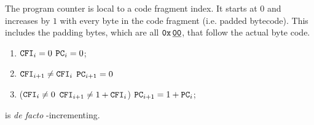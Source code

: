 The program counter \pc{} is local to a code fragment index.
It starts at $0$ and increases by $1$ with every byte in the code fragment (i.e. padded bytecode).
This includes the padding bytes, which are all $\texttt{0x\,}\underline{\texttt{00}}$, that follow the actual byte code.
\begin{enumerate}
    \item \If $\texttt{CFI}_{i} = 0$ \Then $\texttt{PC}_{i} = 0$;
    \item \If $\texttt{CFI}_{i + 1} \neq \texttt{CFI}_{i}$ \Then $\texttt{PC}_{i + 1} = 0$
    \item \If \Big($\texttt{CFI}_{i} \neq 0$ \et $\texttt{CFI}_{i + 1} \neq 1 + \texttt{CFI}_{i}$\Big) \Then $\texttt{PC}_{i + 1} = 1 + \texttt{PC}_{i}$;
\end{enumerate}
\saNote{}
\pc{} is \emph{de facto} \cfi-incrementing.

